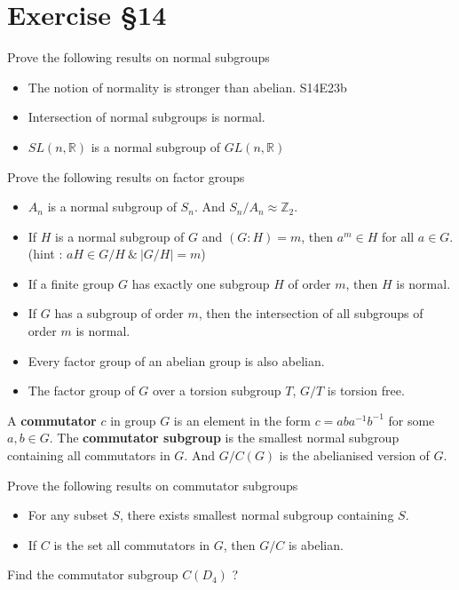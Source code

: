 \section{Exercise \S14}
\begin{remark}Prove the following results on normal subgroups
	\begin{itemize}
		\item The notion of normality is stronger than abelian. S14E23b
		\item Intersection of normal subgroups is normal.%
		\item $SL(n,\mathbb{R})$ is a normal subgroup of $GL(n,\mathbb{R})$%
	\end{itemize}
\end{remark}

\begin{remark}Prove the following results on factor groups
	\begin{itemize}
		\item $A_n$ is a normal subgroup of $S_n$.
			And $S_n/A_n \approx \mathbb{Z}_2$.%
		\item If $H$ is a normal subgroup of $G$ and $(G:H) = m$, then $a^m \in H$ for all $a \in G$.%
			(hint : $aH \in G/H\ \&\ |G/H| = m$)
		\item If a finite group $G$ has exactly one subgroup $H$ of order $m$, then $H$ is normal.%
		\item If $G$ has a subgroup of order $m$, then the intersection of all subgroups of order $m$ is normal.%
		\item Every factor group of an abelian group is also abelian.%
		\item The factor group of $G$ over a torsion subgroup $T$, $G/T$ is torsion free.%
	\end{itemize}
\end{remark}

\begin{definition}
	A \textbf{commutator} $c$ in group $G$ is an element in the form $c = aba^{-1}b^{-1}$ for some $a,b \in G$.
	The \textbf{commutator subgroup} is the smallest normal subgroup containing all commutators in $G$.
	And $G/C(G)$ is the abelianised version of $G$.
\end{definition}

\begin{remark}Prove the following results on commutator subgroups 
	\begin{itemize}
		\item For any subset $S$, there exists smallest normal subgroup containing $S$.%
		\item If $C$ is the set all commutators in $G$, then $G/C$ is abelian.%
	\end{itemize}
\end{remark}
\begin{question}
	Find the commutator subgroup $C(D_4)$ ?
\end{question}

